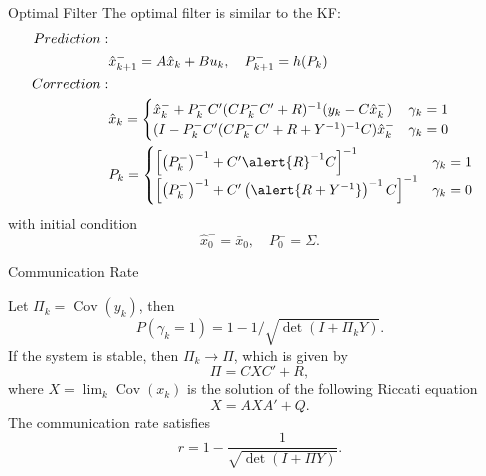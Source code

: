 \documentclass[10pt]{beamer}
\DeclareMathOperator{\Cov}{Cov}
\begin{document}
  \begin{frame}{Optimal Filter}
    The optimal filter is similar to the KF:
    \begin{align*}
      Prediction:&&\\
      &\hat x _{k + 1}^-  = A \hat x_{k} + Bu_k  , \quad P_{k + 1}^-  = h(P_k)\\
      Correction:&&\\
      &\hat x_{k} = \begin{cases}
	\hat x_{k}^-  + P_k^- C'(CP_k^- C'+R)^{-1} (y_k  - C \hat x _{k}^- ) & \gamma_ k = 1\\ 
	(I - P_k^-C'(CP_k^-C'+R+Y^{-1})^{-1}C)\hat x_{k}^-   & \gamma_ k = 0 
      \end{cases}\\
      &P_{k} =\begin{cases}
	\left[\left(P_k^-\right)^{-1} + C'\alert{R}^{-1}C\right]^{-1} & \gamma_k = 1\\
	\left[\left(P_k^-\right)^{-1} + C'\left( \alert{R+Y^{-1} }\right)^{-1}C\right]^{-1}  &\gamma_k = 0
      \end{cases}
    \end{align*}
    with initial condition
    \begin{displaymath}
      \hat x_{0}^-  = \bar x_0 ,\quad P_{0}^-  = \Sigma.
    \end{displaymath}
  \end{frame}

  \begin{frame}{Communication Rate}
    \begin{theorem}
      Let $\Pi_k = \Cov(y_k)$, then
      \begin{displaymath}
	P(\gamma_k = 1) = 1-1/\sqrt{\det(I+\Pi_kY)}.
      \end{displaymath}
      If the system is stable, then $\Pi_k\rightarrow \Pi$, which is given by
      \begin{displaymath}
	\Pi = CX C' + R,
      \end{displaymath}
      where $X = \lim_k \Cov(x_k)$ is the solution of the following Riccati equation
      \begin{displaymath}
	X = AXA' + Q. 
      \end{displaymath}
      The communication rate satisfies
      \begin{displaymath}
	r = 1-\frac{1}{\sqrt{\det(I+\Pi Y)}}.
      \end{displaymath}
    \end{theorem}
  \end{frame}
\end{document}
